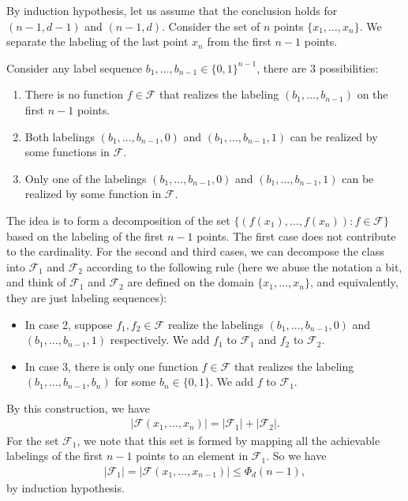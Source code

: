 \documentclass[11pt,letterpaper]{article}
\numberwithin{theorem}{lecture}
\numberwithin{proposition}{lecture}
\numberwithin{lemma}{lecture}
\numberwithin{claim}{lecture}
\numberwithin{corollary}{lecture}
\numberwithin{definition}{lecture}
\numberwithin{conjecture}{lecture}
\numberwithin{remark}{lecture}
\numberwithin{example}{lecture}
\numberwithin{equation}{lecture}
\begin{document}
By induction hypothesis, let us assume that the conclusion holds for $(n - 1, d - 1)$ and $(n - 1, d)$. Consider the set of $n$ points $\{x_1, \ldots, x_n\}$. We separate the labeling of the last point $x_n$ from the first $n - 1$ points.

Consider any label sequence $b_1, \ldots, b_{n - 1} \in \{0, 1\}^{n - 1}$, there are 3 possibilities:
\begin{enumerate}
\item There is no function $f \in \mathcal{F}$ that realizes the labeling $(b_1, \ldots, b_{n - 1})$ on the first $n - 1$ points.
\item Both labelings $(b_1, \ldots, b_{n - 1}, 0)$ and $(b_1, \ldots, b_{n - 1}, 1)$ can be realized by some functions in $\mathcal{F}$.
\item Only one of the labelings $(b_1, \ldots, b_{n - 1}, 0)$ and $(b_1, \ldots, b_{n - 1}, 1)$ can be realized by some function in $\mathcal{F}$.
\end{enumerate}
The idea is to form a decomposition of the set $\{ (f (x_1), \ldots, f (x_n)) : f \in \mathcal{F} \}$ based on the labeling of the first $n - 1$ points. The first case does not contribute to the cardinality. For the second and third cases, we can decompose the class into $\mathcal{F}_1$ and $\mathcal{F}_2$ according to the following rule (here we abuse the notation a bit, and think of $\mathcal{F}_1$ and $\mathcal{F}_2$ are defined on the domain $\{x_1, \ldots, x_{n}\}$, and equivalently, they are just labeling sequences):
\begin{itemize}
\item In case 2, suppose $f_1, f_2 \in \mathcal{F}$ realize the labelings $(b_1, \ldots, b_{n - 1}, 0)$ and $(b_1, \ldots, b_{n - 1}, 1)$ respectively. We add $f_1$ to $\mathcal{F}_1$ and $f_2$ to $\mathcal{F}_2$. 
\item In case 3, there is only one function $f \in \mathcal{F}$ that realizes the labeling $(b_1, \ldots, b_{n - 1}, b_n)$ for some $b_n \in \{0, 1\}$. We add $f$ to $\mathcal{F}_1$.
\end{itemize}
By this construction, we have
\begin{align*}
  |\mathcal{F} (x_1, \ldots, x_n)| = |\mathcal{F}_1 | + |\mathcal{F}_2 |.
\end{align*}
For the set $\mathcal{F}_1$, we note that this set is formed by mapping all the achievable labelings of the first $n - 1$ points to an element in $\mathcal{F}_1$. So we have
\begin{align*}
  |\mathcal{F}_1| = |\mathcal{F} (x_1, \ldots, x_{n - 1})| \leq \Phi_d (n - 1),
\end{align*}
by induction hypothesis.
\end{document}
